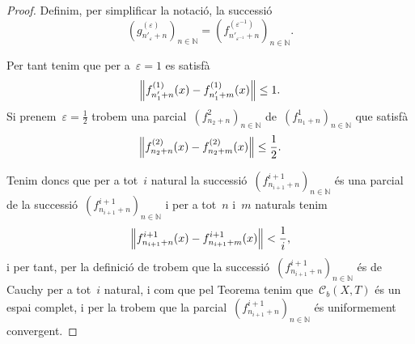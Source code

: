\documentclass[../../Main.tex]{subfiles}
\begin{document}
\begin{lemma}
\begin{proof}
			Definim, per simplificar la notació, la successió
			\[
			    \left(g^{(\varepsilon)}_{n'_{\varepsilon}+n}\right)_{n\in\mathbb{N}}=\left(f^{(\varepsilon^{-1})}_{n'_{\varepsilon^{-1}}+n}\right)_{n\in\mathbb{N}}.
			\]

			Per tant tenim que per a~\(\varepsilon=1\) es satisfà
			\[
			    \norm{f^{(1)}_{n'_{1}+n}(x)-f^{(1)}_{n'_{1}+m}(x)}\leq1.
			\]
			Si prenem~\(\varepsilon=\frac{1}{2}\) trobem una parcial~\((f^{2}_{n_{2}+n})_{n\in\mathbb{N}}\) de~\((f^{1}_{n_{1}+n})_{n\in\mathbb{N}}\) que satisfà
			\[
			    \norm{f^{(2)}_{n_{2}+n}(x)-f^{(2)}_{n_{2}+m}(x)}\leq\frac{1}{2}.
			\]

			Tenim doncs que per a tot~\(i\) natural la successió~\((f^{i+1}_{n_{i+1}+n})_{n\in\mathbb{N}}\) és una parcial de la successió~\((f^{i+1}_{n_{i+1}+n})_{n\in\mathbb{N}}\) i per a tot~\(n\) i~\(m\) naturals tenim
			\[
			    \norm{f^{i+1}_{n_{i+1}+n}(x)-f^{i+1}_{n_{i+1}+m}(x)}<\frac{1}{i},
			\]
			i per tant, per la definició de  trobem que la successió~\((f^{i+1}_{n_{i+1}+n})_{n\in\mathbb{N}}\) és de Cauchy per a tot~\(i\) natural, i com que pel Teorema  tenim que~\(\mathcal{C}_{b}(X,T)\) és un espai complet, i per la  trobem que la parcial~\((f^{i+1}_{n_{i+1}+n})_{n\in\mathbb{N}}\) és uniformement convergent.
		\end{proof}
	\end{lemma}
\end{document}
